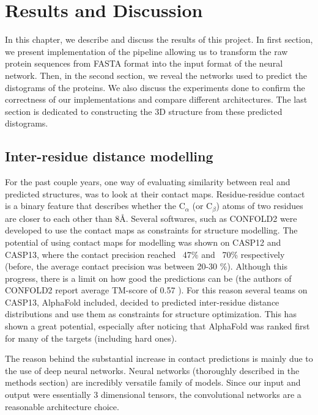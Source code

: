 \chapter{Results and Discussion}
In this chapter, we describe and discuss the results of this project.
In first section, we present implementation of the pipeline allowing us to transform the raw protein sequences from FASTA format into the input format of the neural network.
Then, in the second section, we reveal the networks used to predict the distograms of the proteins.
We also discuss the experiments done to confirm the correctness of our implementations and compare different architectures.
The last section is dedicated to constructing the 3D structure from these predicted distograms.



\newpage
\section{Inter-residue distance modelling}

For the past couple years, one way of evaluating similarity between real and predicted structures, was to look at their contact maps. Residue-residue contact is a binary feature that describes whether the C$_\alpha$ (or C$_\beta$) atoms of two residues are closer to each other than 8\AA. Several softwares, such as CONFOLD2 \cite{confold, confold2} were developed to use the contact maps as constraints for structure modelling. The potential of using contact maps for modelling was shown on CASP12 and CASP13, where the contact precision reached ~47\% and ~70\% respectively (before, the average contact precision was between 20-30 \%). Although this progress, there is a limit on how good the predictions can be (the authors of CONFOLD2 report average TM-score of 0.57 \cite{confold2}). For this reason several teams on CASP13, AlphaFold included, decided to predicted inter-residue distance distributions and use them as constraints for structure optimization. This has shown a great potential, especially after noticing that AlphaFold was ranked first for many of the targets (including hard ones).

The reason behind the substantial increase in contact predictions is mainly due to the use of deep neural networks. Neural networks (thoroughly described in the methods section) are incredibly versatile family of models. Since our input and output were essentially 3 dimensional tensors, the convolutional networks are a reasonable architecture choice. 

